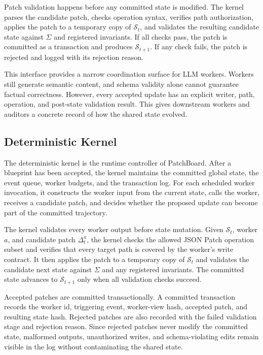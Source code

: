 \documentclass[11pt]{article}
\newcommand{\method}{PatchBoard}
\newcommand{\state}{\mathcal{S}}
\newcommand{\schema}{\Sigma}
\newcommand{\patch}{\Delta}
\begin{document}
Patch validation happens before any committed state is modified. The kernel parses the candidate patch, checks operation syntax, verifies path authorization, applies the patch to a temporary copy of $\state_t$, and validates the resulting candidate state against $\schema$ and registered invariants. If all checks pass, the patch is committed as a transaction and produces $\state_{t+1}$. If any check fails, the patch is rejected and logged with its rejection reason.

This interface provides a narrow coordination surface for LLM workers. Workers still generate semantic content, and schema validity alone cannot guarantee factual correctness. However, every accepted update has an explicit writer, path, operation, and post-state validation result. This gives downstream workers and auditors a concrete record of how the shared state evolved.

\subsection{Deterministic Kernel}
\label{sec:kernel}

The deterministic kernel is the runtime controller of \method{}. After a blueprint has been accepted, the kernel maintains the committed global state, the event queue, worker budgets, and the transaction log. For each scheduled worker invocation, it constructs the worker input from the current state, calls the worker, receives a candidate patch, and decides whether the proposed update can become part of the committed trajectory.

The kernel validates every worker output before state mutation. Given $\state_t$, worker $a$, and candidate patch $\patch_t^a$, the kernel checks the allowed JSON Patch operation subset and verifies that every target path is covered by the worker's write contract. It then applies the patch to a temporary copy of $\state_t$ and validates the candidate next state against $\schema$ and any registered invariants. The committed state advances to $\state_{t+1}$ only when all validation checks succeed.

Accepted patches are committed transactionally. A committed transaction records the worker id, triggering event, worker-view hash, accepted patch, and resulting state hash. Rejected patches are also recorded with the failed validation stage and rejection reason. Since rejected patches never modify the committed state, malformed outputs, unauthorized writes, and schema-violating edits remain visible in the log without contaminating the shared state.
\end{document}
